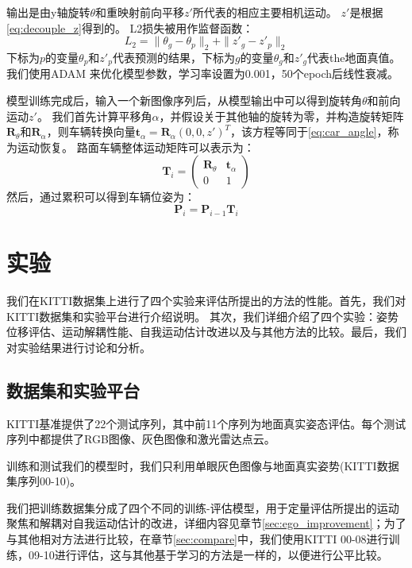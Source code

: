 输出是由y轴旋转$\theta $和重映射前向平移$z'$所代表的相应主要相机运动。  {$z'$是根据\eqref{eq:decouple_z}}得到的。
L2损失被用作监督函数：
\begin{equation}
    L_2 = \|\theta_g -\theta_p\|_2 +\|z'_g -z'_p \|_2
\end{equation}
下标为$p$的变量$\theta_p$和{$z'_p$}代表预测的{结果}，下标为$g$的变量$\theta_g$和{$z'_g$}代表{the}地面真值。
我们使用ADAM \cite{kingma2014adam}来优化模型参数，学习率设置为0.001，50个epoch后线性衰减。%

模型训练完成后，输入一个新图像序列后，从模型输出中可以得到旋转角$\theta$和前向运动{$z'$}。
我们首先计算平移角$\alpha$，并假设关于其他轴的旋转为零，并构造旋转矩阵$\mathbf{R}_\theta$和$\mathbf{R}_\alpha$，则车辆转换向量{$\mathbf{t}_\alpha=\mathbf{R}_\alpha(0,0,z')^T$}，该方程等同于\eqref{eq:car_angle}，称为运动恢复。
路面车辆整体运动矩阵可以表示为： 
\begin{equation}
    \mathbf{T}_i =\begin{pmatrix} \mathbf{R}_\theta & \mathbf{t}_\alpha\\ 0 & 1  \end{pmatrix} 
    \label{eq:rt_final}
\end{equation}
然后，通过累积可以得到车辆位姿为： 
\begin{equation}
    \mathbf{P}_i = \mathbf{P}_{i-1}\mathbf{T}_i
    \label{eq:pose}
\end{equation}
\section{实验}
\label{sec:experiments}
我们在KITTI数据集\cite{geiger2012kitti}上进行了四个实验来评估所提出的方法的性能。首先，我们对KITTI数据集和实验平台进行介绍说明。
其次，我们详细介绍了四个实验：姿势位移评估、运动解耦性能、自我运动估计改进以及与其他方法的比较。最后，我们对实验结果进行讨论和分析。

\subsection{数据集和实验平台}

KITTI基准提供了22个测试序列，其中前11个序列为地面真实姿态评估。每个测试序列中都提供了{RGB图像、灰色图像和激光雷达点云}。


训练和测试我们的模型时，我们只利用单眼灰色图像与地面真实姿势{(KITTI数据集序列00-10)}。

{我们把训练数据集分成了四个不同的训练-评估模型，用于定量评估所提出的运动聚焦和解耦对自我运动估计的改进，详细内容见章节\ref{sec:ego_improvement}；为了与其他相对方法进行比较，在章节\ref{sec:compare}中，我们使用KITTI 00-08进行训练，09-10进行评估，这与其他基于学习的方法是一样的，以便进行公平比较。} 

